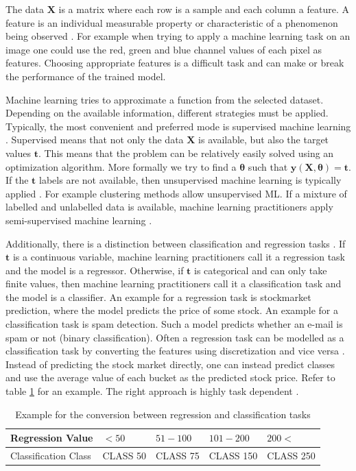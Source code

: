 \documentclass[draft,final,oneside]{vutinfth} %
\begin{document}
The data $\boldsymbol{X}$ is a matrix where each row is a sample and each column a feature. A feature is an individual measurable property or characteristic of a phenomenon being observed \cite{bishop}. For example when trying to apply a machine learning task on an image one could use the red, green and blue channel values of each pixel as features. Choosing appropriate features is a difficult task and can make or break the performance of the trained model.

Machine learning tries to approximate a function from the selected dataset. Depending on the available information, different strategies must be applied. Typically, the most convenient and preferred mode is supervised machine learning \cite{aimodern}. Supervised means that not only the data $\boldsymbol{X}$ is available, but also the target values $\boldsymbol{t}$. This means that the problem can be relatively easily solved using an optimization algorithm. More formally we try to find a $\boldsymbol{\theta}$ such that $\boldsymbol{y}(\boldsymbol{X}, \boldsymbol{\theta}) = \boldsymbol{t}$. If the $\boldsymbol{t}$ labels are not available, then unsupervised machine learning is typically applied \cite{aimodern}. For example clustering methods allow unsupervised ML. If a mixture of labelled and unlabelled data is available, machine learning practitioners apply semi-supervised machine learning \cite{semisupervised}.

Additionally, there is a distinction between classification and regression tasks \cite{bishop}. If $\boldsymbol{t}$ is a continuous variable, machine learning practitioners call it a regression task and the model is a regressor. Otherwise, if $\boldsymbol{t}$ is categorical and can only take finite  values, then machine learning practitioners call it a classification task and the model is a classifier. An example for a regression task is stockmarket prediction, where the model predicts the price of some stock. An example for a classification task is spam detection. Such a model predicts whether an e-mail is spam or not (binary classification). Often a regression task can be modelled as a classification task by converting the features using discretization and vice versa \cite{discretization}. Instead of predicting the stock market directly, one can instead predict classes and use the average value of each bucket as the predicted stock price. Refer to table \ref{table:conversionregressclass} for an example. The right approach is highly task dependent \cite{aimodern}.

\begin{table}[]
\centering
\begin{tabular}{|l||l|l|l|l|}
\hline
Regression Value & $<50$ & $51 - 100$ & $101 - 200$ & $200<$ \\
\hline
Classification Class & CLASS 50      & CLASS 75 & CLASS 150 & CLASS 250 \\
\hline
\end{tabular}
\caption{Example for the conversion between regression and classification tasks }
\label{table:conversionregressclass}
\end{table}
\end{document}
